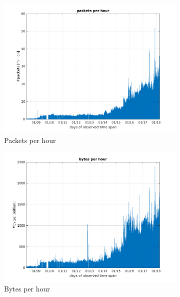 \documentclass{article}
\begin{document}
\begin{figure}[h]
    \begin{subfigure}{.5\textwidth}
        \centering
        \includegraphics[width=\textwidth]{../exercise-3/plots/rep_10_1}
        \caption{Packets per hour}
    \end{subfigure}
    \begin{subfigure}{.5\textwidth}
        \centering
        \includegraphics[width=\textwidth]{../exercise-3/plots/rep_10_2}
        \caption{Bytes per hour}
    \end{subfigure}
    \begin{subfigure}{.5\textwidth}
        \centering

\end{subfigure}
\end{figure}
\end{document}
